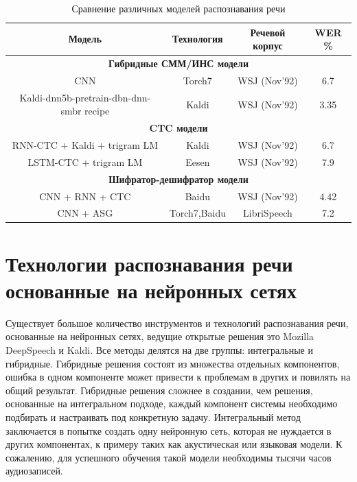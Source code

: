\documentclass[conference]{IEEEtran}
\begin{document}
    \begin{table}[htp]
        \caption{Сравнение различных моделей распознавания речи}
        \begin{center}
            \begin{tabular}{|c|c|c|c|}
                \hline
                Модель & Технология & Речевой корпус & WER \% \\
                \hline
                \multicolumn{4}{|c|}{\textbf{Гибридные СММ/ИНС модели}} \\
                \hline
                CNN & Torch7 & WSJ (Nov’92) & 6.7 \\
                \hline
                Kaldi-dnn5b-pretrain-dbn-dnn-smbr recipe & Kaldi & WSJ (Nov’92) & 3.35 \\
                \hline
                \multicolumn{4}{|c|}{\textbf{CTC модели}} \\
                \hline
                RNN-CTC + Kaldi + trigram LM & Kaldi & WSJ (Nov’92) & 6.7 \\
                \hline
                LSTM-CTC + trigram LM & Eesen & WSJ (Nov’92) & 7.9 \\
                \hline
                \multicolumn{4}{|c|}{\textbf{Шифратор-дешифратор модели}} \\
                \hline
                CNN + RNN + CTC & Baidu & WSJ (Nov’92) & 4.42 \\
                \hline
                CNN + ASG & Torch7,Baidu & LibriSpeech & 7.2 \\
                \hline
            \end{tabular}
            \label{tab1}
        \end{center}
    \end{table}


    \section{Технологии распознавания речи основанные на нейронных сетях}
    Существует большое количество инструментов и технологий распознавания речи, основанные на нейронных сетях, ведущие открытые решения это Mozilla DeepSpeech и Kaldi. Все методы делятся на две группы: интегральные и гибридные.
    Гибридные решения состоят из множества отдельных компонентов, ошибка в одном компоненте может привести к проблемам в других и повилять на общий результат. Гибридные решения сложнее в создании, чем решения, основанные на интегральном подходе, каждый компонент системы необходимо подбирать и настраивать под конкретную задачу.
    Интегральный метод заключается в попытке создать одну нейронную сеть, которая не нуждается в других компонентах, к примеру таких как акустическая или языковая модели. К сожалению, для успешного обучения такой модели необходимы тысячи часов аудиозаписей.
\end{document}
